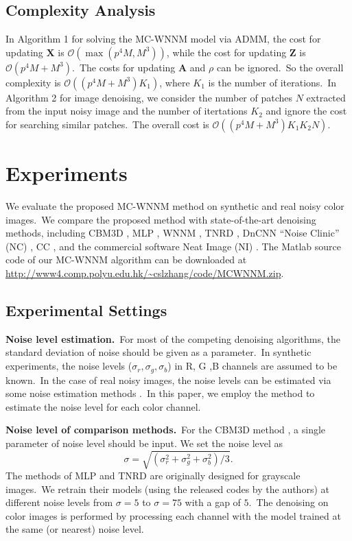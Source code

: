 \subsection{Complexity Analysis}

In Algorithm 1 for solving the MC-WNNM model via ADMM, the cost for updating $\bm{X}$ is $\mathcal{O}(\max(p^{4}M, M^{3}))$, while the cost for updating $\bm{Z}$ is $\mathcal{O}(p^{4}M+M^{3})$.\ The costs for updating $\bm{A}$ and $\rho$ can be ignored.\ So the overall complexity is $\mathcal{O}((p^{4}M+M^{3})K_{1})$, where $K_{1}$ is the number of iterations.\ In Algorithm 2 for image denoising, we consider the number of patches $N$ extracted from the input noisy image and the number of itertations $K_{2}$ and ignore the cost for searching similar patches.\ The overall cost is $\mathcal{O}((p^{4}M+M^{3})K_{1}K_{2}N)$.

\section{Experiments}

We evaluate the proposed MC-WNNM method on synthetic and real noisy color images.\ We compare the proposed method with state-of-the-art denoising methods, including CBM3D \cite{cbm3d}, MLP \cite{mlp}, WNNM \cite{wnnm}, TNRD \cite{chen2015learning}, DnCNN \cite{dncnn} ``Noise Clinic'' (NC) \cite{noiseclinic,ncwebsite}, CC \cite{crosschannel2016}, and the commercial software Neat Image (NI) \cite{neatimage}. The Matlab source code of our MC-WNNM algorithm can be downloaded at \url{http://www4.comp.polyu.edu.hk/~cslzhang/code/MCWNNM.zip}.

\subsection{Experimental Settings}


\textbf{Noise level estimation.}\
For most of the competing denoising algorithms, the standard deviation of noise should be given as a parameter.\ In synthetic experiments, the noise levels ($\sigma_{r}, \sigma_{g}, \sigma_{b}$) in R, G ,B channels are assumed to be known.\ In the case of real noisy images, the noise levels can be estimated via some noise estimation methods \cite{noiselevel,Chen2015ICCV}.\ In this paper, we employ the method \cite{Chen2015ICCV} to estimate the noise level for each color channel. 

\textbf{Noise level of comparison methods.}\ 
For the CBM3D method \cite{cbm3d}, a single parameter of noise level should be input. We set the noise level as
\begin{equation}
\label{e21}
\sigma = \sqrt{(\sigma_{r}^{2}+\sigma_{g}^{2}+\sigma_{b}^{2})/3}.
\end{equation}
The methods of MLP \cite{mlp} and TNRD \cite{chen2015learning} are originally designed for grayscale images.\ We retrain their models (using the released codes by the authors) at different noise levels from $\sigma=5$ to $\sigma=75$ with a gap of $5$.\ The denoising on color images is performed by processing each channel with the model trained at the same (or nearest) noise level. 

